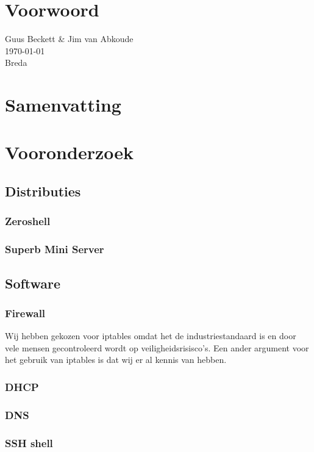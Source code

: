 \documentclass[12pt]{article}
\begin{document}
\clearpage
\section*{Voorwoord}

Guus Beckett \& Jim van Abkoude \\
\today \\
Breda
\newpage
\section*{Samenvatting}
\lipsum[0-2]
\newpage
\tableofcontents
\newpage
{}
\section{Vooronderzoek}
\subsection{Distributies}
\subsubsection{Zeroshell}
\subsubsection{Superb Mini Server}
\subsection{Software}
\subsubsection{Firewall}
Wij hebben gekozen voor iptables omdat het de industriestandaard is en door vele mensen gecontroleerd wordt op veiligheidsrisisco's. Een ander argument voor het gebruik van iptables is dat wij er al kennis van hebben.
\subsubsection{DHCP}

\subsubsection{DNS}
\subsubsection{SSH shell}
\end{document}
